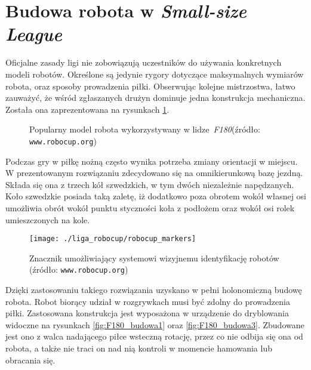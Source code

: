 \section{Budowa robota \label{sec:budowa_robota} w \emph{Small-size League}}
	Oficjalne zasady ligi nie zobowiązują uczestników do używania konkretnych modeli robotów. Określone są jedynie rygory dotyczące maksymalnych wymiarów robota, oraz sposoby prowadzenia piłki.
	Obserwując kolejne mistrzostwa, łatwo zauważyć, że wśród zgłaszanych drużyn dominuje jedna konstrukcja mechaniczna. Została ona zaprezentowana na  rysunkach \ref{fig:F180_budowa}.
 	\begin{figure}
	\centering
	\caption{Popularny model robota wykorzystywany w \mbox{lidze \emph{F180}}\newline(źródło: \texttt{www.robocup.org}) }
	\label{fig:F180_budowa}
	\end{figure}
	Podczas gry w piłkę nożną często wynika potrzeba zmiany orientacji w miejscu. W prezentowanym rozwiązaniu
	zdecydowano się na omnikierunkową bazę jezdną. Składa się ona z trzech kół szwedzkich, w tym dwóch niezależnie
	napędzanych. Koło szwedzkie posiada taką zaletę, iż dodatkowo poza obrotem wokół własnej osi umożliwia obrót
	wokół punktu styczności koła z podłożem oraz wokół osi rolek umieszczonych na kole.
	\begin{wrapfigure}{r}{0.42\textwidth}
	\vspace{-20pt}
	\begin{center}	
	\texttt{[image: ./liga\_robocup/robocup\_markers]}
	\end{center}
	\caption{Znacznik umożliwiający systemowi wizyjnemu identyfikację robotów \newline(źródło: \texttt{www.robocup.org})\label{fig:znacznik}}
	\vspace{-60pt}
	\end{wrapfigure}
	Dzięki zastosowaniu takiego rozwiązania uzyskano w pełni holonomiczną budowę robota.
	Robot biorący udział w rozgrywkach musi być zdolny do prowadzenia piłki. Zastosowana konstrukcja jest wyposażona w urządzenie do dryblowania widoczne na rysunkach \ref{fig:F180_budowa1} oraz \ref{fig:F180_budowa3}. 
	Zbudowane jest ono z walca nadającego piłce wsteczną rotację, przez co nie odbija się ona od robota, a także nie traci on nad nią kontroli w momencie hamowania lub obracania się.
	
